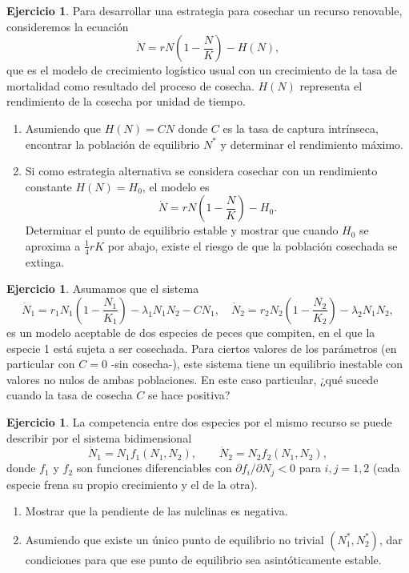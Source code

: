 \documentclass[12pt, a4paper]{amsbook}
\theoremstyle{remark}
\theoremstyle{definition}
\newtheorem{ejer}[teo]{Ejercicio}
\numberwithin{section}{chapter}
\numberwithin{subsection}{section}
\numberwithin{equation}{section}
\numberwithin{figure}{chapter}
\begin{document}
\begin{ejer}
Para desarrollar una estrategia para cosechar un recurso renovable, consideremos la ecuación
$$
\dot N = r N \left(1-\frac{N}{K}\right) - H(N),
$$
que es el modelo de crecimiento logístico usual con un crecimiento de la tasa de mortalidad como resultado del proceso de cosecha. $H(N)$ representa el rendimiento de la cosecha por unidad de tiempo.
\begin{enumerate}
\item Asumiendo que $H(N) = CN$ donde $C$ es la tasa de captura intrínseca, encontrar la población de equilibrio $N^*$ y determinar el rendimiento máximo.

\item Si como estrategia alternativa se considera cosechar con un rendimiento constante $H(N)=H_0$, el modelo es
$$
\dot N = r N \left(1-\frac{N}{K}\right) - H_0.
$$
Determinar el punto de equilibrio estable y mostrar que cuando $H_0$ se aproxima a $\frac14 rK$ por abajo, existe el riesgo de que la población cosechada se extinga.
\end{enumerate}
\end{ejer}


\begin{ejer}
Asumamos que el sistema
$$
\dot N_1 = r_1 N_1 \left(1-\frac{N_1}{K_1}\right) - \lambda_1 N_1 N_2 - C N_1, \quad \dot N_2 = r_2 N_2 \left(1-\frac{N_2}{K_2}\right) - \lambda_2 N_1 N_2,
$$
es un modelo aceptable de dos especies de peces que compiten, en el que la especie 1 está sujeta a ser cosechada. Para ciertos valores de los parámetros (en particular con $C=0$ -sin cosecha-), este sistema tiene un equilibrio inestable con valores no nulos de ambas poblaciones. En este caso particular, ¿qué sucede cuando la tasa de cosecha $C$ se hace positiva?
\end{ejer}

\begin{ejer}
La competencia entre dos especies por el mismo recurso se puede describir por el sistema bidimensional
$$
\dot N_1 = N_1 f_1(N_1, N_2),\qquad \dot N_2 = N_2 f_2(N_1, N_2),
$$
donde $f_1$ y $f_2$ son funciones diferenciables con $\partial f_i/\partial N_j<0$ para $i,j=1,2$ (cada especie frena su propio crecimiento y el de la otra).
\begin{enumerate}
\item Mostrar que la pendiente de las nulclinas es negativa.
\item Asumiendo que existe un único punto de equilibrio no trivial $(N_1^*, N_2^*)$, dar condiciones para que ese punto de equilibrio sea asintóticamente estable.
\end{enumerate}
\end{ejer}
\end{document}
